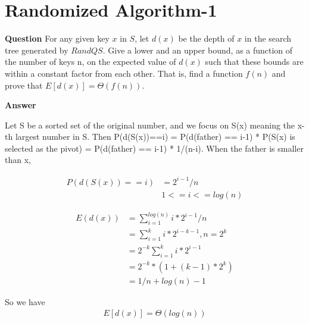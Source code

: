 \documentclass[12pt]{article}
\begin{document}
\section{Randomized Algorithm-1}
\textbf{Question}
For any given key $x$ in $S$, let $d(x)$ be the depth of $x$ in the search tree generated by $RandQS$. Give a lower and an upper bound, as a function of the number of keys n, on the expected value of $d(x)$ such that these bounds are within a constant factor from each other. That is, find a function $f(n)$ and prove that $E[d(x)]=\Theta(f(n))$.

\textbf{Answer}



Let S be a sorted set of the original number, and we focus on S(x) meaning the x-th largest number in S. Then P(d(S(x))==i) = P(d(father) == i-1) * P(S(x) is selected as the pivot) = P(d(father) == i-1) * 1/(n-i). When the father is smaller than x, 

\begin{equation}
\begin{aligned}
P(d(S(x))==i) &= 2^{i-1}/n\\
&1<=i <= log(n)
\end{aligned}
\end{equation}

\begin{equation}
\begin{aligned}
E(d(x)) &= \sum_{i=1}^{log(n)}  i*2^{i-1}/n\\
&=\sum_{i=1}^{k}  i*2^{i-k-1}, n = 2^k\\
&=2^{-k}\sum_{i=1}^{k}i*2^{i-1}\\
&=2^{-k}*(1+(k-1)*2^k)\\
&=1/n + log(n) - 1
\end{aligned}
\end{equation}

So we have
\begin{equation}
\begin{aligned}
E[d(x)] = \Theta(log(n))\\
\end{aligned}
\end{equation}
\end{document}
